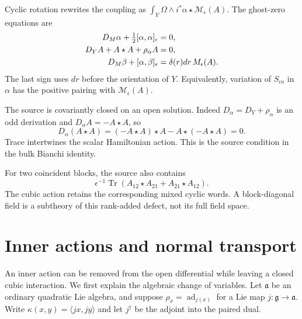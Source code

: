 Cyclic rotation rewrites the coupling as
$\int_Y\Omega\wedge i^*\alpha\star\mathcal M_\epsilon(A)$.
The ghost-zero equations are
\begin{align}
 D_M\alpha+\tfrac12[\alpha,\alpha]_\epsilon&=0,\notag\\
 D_YA+A\star A+\rho_\alpha A&=0,\notag\\
 D_M\beta+[\alpha,\beta]_\epsilon
       &=\delta(r)dr\,\mathcal M_\epsilon(A).
       \label{mht:eq:geometric-source-equation}
\end{align}
The last sign uses $dr$ before the orientation of $Y$.
Equivalently, variation of $S_{co}$ in $\alpha$ has the
positive pairing with $\mathcal M_\epsilon(A)$.

The source is covariantly closed on an open solution.
Indeed $D_\alpha=D_Y+\rho_\alpha$ is an odd derivation and
$D_\alpha A=-A\star A$, so
\[
 D_\alpha(A\star A)
   =(-A\star A)\star A-A\star(-A\star A)=0.
\]
Trace intertwines the scalar Hamiltonian action. This is
the source condition in the bulk Bianchi identity.

For two coincident blocks, the source also contains
\[
 \epsilon^{-1}\operatorname{Tr}
       (A_{12}\star A_{21}+A_{21}\star A_{12}).
\]
The cubic action retains the corresponding mixed cyclic
words. A block-diagonal field is a subtheory of this
rank-added defect, not its full field space.

\section{Inner actions and normal transport}

An inner action can be removed from the open differential
while leaving a closed cubic interaction. We first explain
the algebraic change of variables. Let $\mathfrak a$ be an
ordinary quadratic Lie algebra, and suppose
$\rho_x=\operatorname{ad}_{j(x)}$ for a Lie map
$j:\mathfrak g\to\mathfrak a$.
Write $\kappa(x,y)=\langle jx,jy\rangle$ and let
$j^\dagger$ be the adjoint into the paired dual.

